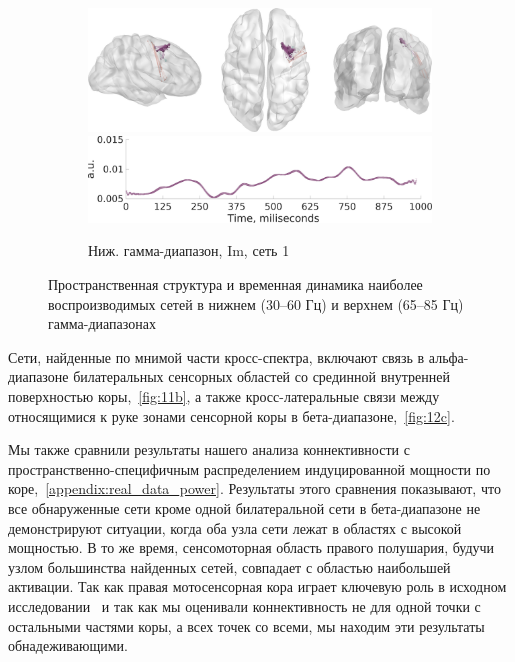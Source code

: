 \begin{figure}
 \begin{subfigure}[b]{0.4\textwidth}
 \includegraphics[width=\textwidth]{../images/psiicos_paper/Figure13_c1.jpg}
 \includegraphics[width=\textwidth]{../images/psiicos_paper/Figure13_c2.jpg}
 \caption{Ниж. гамма-диапазон, Im, сеть 1}\label{fig:13c}
 \end{subfigure}
 \caption{Пространственная структура и временная динамика наиболее воспроизводимых сетей в нижнем (30--60 Гц) и верхнем (65--85 Гц) гамма-диапазонах}\label{fig:13}
\end{figure} %

Сети, найденные по мнимой части кросс-спектра, включают связь в альфа-диапазоне
билатеральных сенсорных областей со срединной внутренней поверхностью
коры,~\ref{fig:11b}, а также кросс-латеральные связи между относящимися к руке
зонами сенсорной коры в бета-диапазоне,~\ref{fig:12c}.

Мы также сравнили результаты нашего анализа коннективности с
пространственно-специфичным распределением индуцированной мощности по
коре,~\ref{appendix:real_data_power}. Результаты этого сравнения показывают,
что все обнаруженные сети кроме одной билатеральной сети в бета-диапазоне не
демонстрируют ситуации, когда оба узла сети лежат в областях с высокой
мощностью. В то же время, сенсомоторная область правого полушария, будучи узлом
большинства найденных сетей, совпадает с областью наибольшей активации. Так как
правая мотосенсорная кора играет ключевую роль в исходном
исследовании~\cite{DeLange2008} и так как мы оценивали коннективность не для
одной точки с остальными частями коры, а всех точек со всеми, мы находим эти
результаты обнадеживающими.
